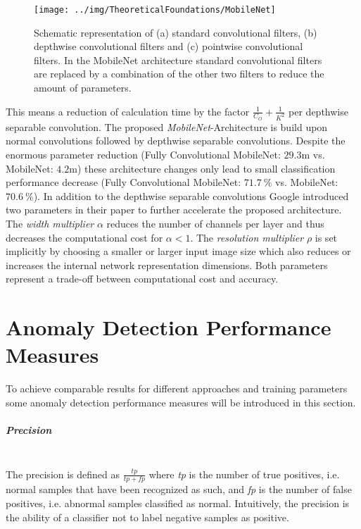 \begin{figure}[H]
\centering
\texttt{[image: ../img/TheoreticalFoundations/MobileNet]}
\caption{Schematic representation of (a) standard convolutional filters, (b) depthwise convolutional filters and (c) pointwise convolutional filters. In the MobileNet architecture standard convolutional filters are replaced by a combination of the other two filters to reduce the amount of parameters. \cite{MobileNet}}
\label{fig:MobileNet}
\end{figure}

\noindent This means a reduction of calculation time by the factor $\frac{1}{C_O}+\frac{1}{K^2}$ per depthwise separable convolution. The proposed \textit{MobileNet}-Architecture is build upon normal convolutions followed by depthwise separable convolutions. Despite the enormous parameter reduction (Fully Convolutional MobileNet: $29.3\text{m}$ vs. MobileNet: $4.2\text{m}$) these architecture changes only lead to small classification performance decrease (Fully Convolutional MobileNet: $71.7\:\%$ vs. MobileNet: $70.6\:\%$). In addition to the depthwise separable convolutions Google introduced two parameters in their paper to further accelerate the proposed architecture. The \textit{width multiplier} $\alpha$ reduces the number of channels per layer and thus decreases the computational cost for $\alpha < 1$. The \textit{resolution multiplier} $\rho$ is set implicitly by choosing a smaller or larger input image size which also reduces or increases the internal network representation dimensions. Both parameters represent a trade-off between computational cost and accuracy.  


\section{Anomaly Detection Performance Measures}
\label{sec:AnomalyDetectionPerformanceMeasures}
To achieve comparable results for different approaches and training parameters some anomaly detection performance measures will be introduced in this section.

\subparagraph{Precision}\mbox{}\\
The precision is defined as $\frac{tp}{tp+fp}$ where \textit{tp} is the number of true positives, i.e. normal samples that have been recognized as such, and \textit{fp} is the number of false positives, i.e. abnormal samples classified as normal. Intuitively, the precision is the ability of a classifier not to label negative samples as positive.

